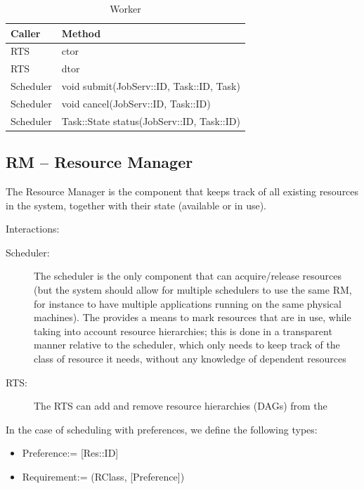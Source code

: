\documentclass[10pt]{article}
\newcommand{\rts}{RTS\xspace}
\newcommand{\sched}{Scheduler\xspace}
\newcommand{\rman}{RM\xspace}
\newcommand{\js}{JobServ\xspace}
\newcommand{\task}{Task\xspace}
\newcommand{\res}{Res\xspace}
\newcommand{\rc}{RClass\xspace}
\newcommand{\pref}{Preference\xspace}
\newcommand{\req}{Requirement\xspace}
\newcommand{\id}{::ID\xspace}
\begin{document}
%
\begin{table}[ht]
    \centering
    \caption{Worker}
    \label{tab:worker}
    \bgroup
    \setlength{\tabcolsep}{2em}
    \begin{tabular}{ll}
        \toprule
        Caller & Method \\
        \midrule
        \rts & ctor \\
        \rts & dtor \\
        \sched & void submit(\js\id, \task\id, \task)  \\
        \sched & void cancel(\js\id, \task\id) \\
        \sched & \task::State status(\js\id, \task\id) \\
        \bottomrule
    \end{tabular}
    \egroup
\end{table}
%


\subsection{RM -- Resource Manager}

The Resource Manager is the component that keeps track of all existing resources in the system, together with their state (available or in use). 

Interactions:
\begin{description}
    \item [\sched:] The scheduler is the only component that can acquire/release resources (but the system should allow for multiple schedulers to use the same \rman, for instance to have multiple applications running on the same physical machines). The \rm provides a means to mark resources that are in use, while taking into account resource hierarchies; this is done in a transparent manner relative to the scheduler, which only needs to keep track of the class of resource it needs, without any knowledge of dependent resources
    \item [\rts:] The \rts can add and remove resource hierarchies (DAGs) from the \rm
\end{description}

In the case of scheduling with preferences, we define the following types:
\begin{itemize}
    \item \pref := [\res\id]
    \item \req := (\rc, [\pref])
\end{itemize}
\end{document}
